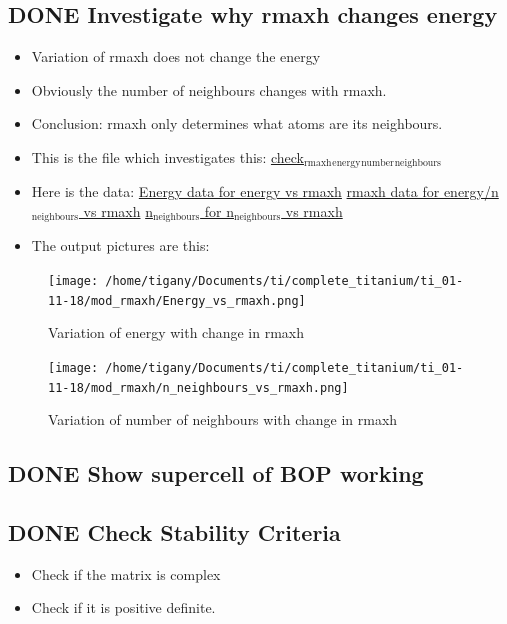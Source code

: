 \documentclass[11pt]{article}
\begin{document}
\subsection{{\bfseries\sffamily DONE} Investigate why rmaxh changes energy}
\label{sec-1-7}
\begin{itemize}
\item Variation of rmaxh does not change the energy
\item Obviously the number of neighbours changes with rmaxh.
\item Conclusion: rmaxh only determines what atoms are its neighbours.
\item This is the file which investigates this:
\href{file:///home/tigany/Documents/ti/complete_titanium/ti_01-11-18/mod_rmaxh/check_rmaxh_energy_neighbours.py}{check$_{\text{rmaxh}}$$_{\text{energy}}$$_{\text{number}}$$_{\text{neighbours}}$}
\item Here is the data:
\href{file:///home/tigany/Documents/ti/complete_titanium/ti_01-11-18/mod_rmaxh/energy_for_energy_vs_rmaxh.pkl}{Energy data for energy vs rmaxh}
\href{file:///home/tigany/Documents/ti/complete_titanium/ti_01-11-18/mod_rmaxh/rmaxh_for_energy_or_n_neighbours_vs_rmaxh.pkl}{rmaxh data for energy/n$_{\text{neighbours}}$ vs rmaxh}
\href{file:///home/tigany/Documents/ti/complete_titanium/ti_01-11-18/mod_rmaxh/n_neighbours_for_n_neighbours_vs_rmaxh.pkl}{n$_{\text{neighbours}}$ for n$_{\text{neighbours}}$ vs rmaxh}
\item The output pictures are this:
\end{itemize}
\begin{figure}[htb]
\centering
\texttt{[image: /home/tigany/Documents/ti/complete\_titanium/ti\_01-11-18/mod\_rmaxh/Energy\_vs\_rmaxh.png]}
\caption{\label{fig:Energy_vs_rmaxh.png}Variation of energy with change in rmaxh}
\end{figure}
\begin{figure}[htb]
\centering
\texttt{[image: /home/tigany/Documents/ti/complete\_titanium/ti\_01-11-18/mod\_rmaxh/n\_neighbours\_vs\_rmaxh.png]}
\caption{\label{fig:n_neighbours_vs_rmaxh.png}Variation of number of neighbours with change in rmaxh}
\end{figure}

\subsection{{\bfseries\sffamily DONE} Show supercell of BOP working}
\label{sec-1-8}
\subsection{{\bfseries\sffamily DONE} Check Stability Criteria}
\label{sec-1-9}
\begin{itemize}
\item Check if the matrix is complex
\item Check if it is positive definite.
\end{itemize}
\end{document}
